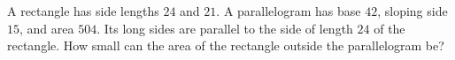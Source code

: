 A rectangle has side lengths $24$ and $21$. A parallelogram has base $42$, sloping side $15$, and area $504$. Its long sides are parallel to the side of length $24$ of the rectangle. How small can the area of the rectangle outside the parallelogram be?
